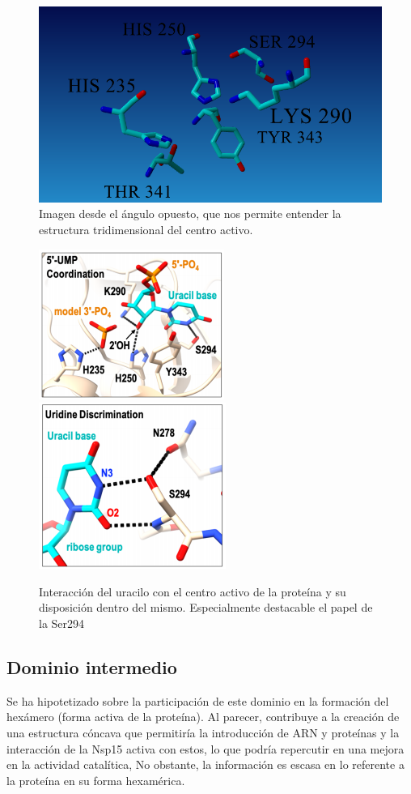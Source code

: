 \documentclass[12pt]{article}
\begin{document}
\begin{figure}[H]
\centering
\includegraphics[width=1\textwidth]{Screenshot_13}
\caption{Imagen desde el ángulo opuesto, que nos permite entender la estructura tridimensional del centro activo.}
\end{figure}

\begin{figure}[H]
\centering
\includegraphics[scale=1.115]{Screenshot_18}
\includegraphics[scale=1]{Screenshot_19}
\caption{Interacción del uracilo con el centro activo de la proteína y su disposición dentro del mismo. Especialmente destacable el papel de la Ser294}
\end{figure}




\subsection{Dominio intermedio}
Se ha hipotetizado sobre la participación de este dominio en la formación del  hexámero (forma activa de la proteína). Al parecer, contribuye a la creación de una estructura cóncava que permitiría la introducción de ARN y proteínas y la interacción de la Nsp15 activa con estos, lo que podría repercutir en una mejora en la actividad catalítica, No obstante, la información es escasa en lo referente a la proteína en su forma hexamérica.
\newline
\end{document}
